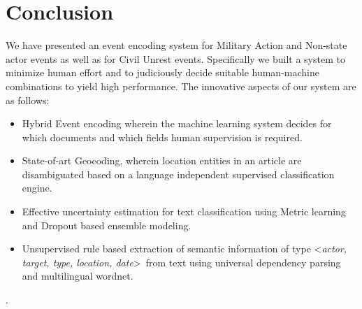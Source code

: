 \section{Conclusion}
We have presented an event encoding system for Military Action and Non-state actor events as well as for Civil Unrest events. Specifically we built a system to minimize human effort and to judiciously decide suitable human-machine combinations to yield high performance. The  innovative aspects of our system are as follows:
\begin{itemize}
    \item Hybrid Event encoding wherein the machine learning system decides for which documents and which fields human supervision is required.
    \item State-of-art Geocoding, wherein location entities in an article are disambiguated based on a language independent supervised classification engine.
    \item Effective uncertainty estimation for text classification using Metric learning and Dropout based ensemble modeling.
    \item Unsupervised rule based extraction of semantic information of type \textless \textit{actor, target, type, location, date}\textgreater~from text using universal dependency parsing and multilingual wordnet.
\end{itemize}



.
